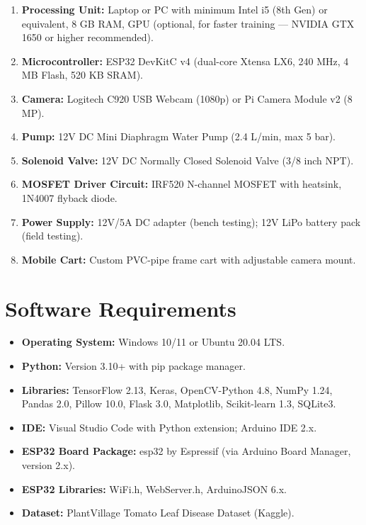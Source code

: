 \documentclass[12pt,a4paper,oneside]{report}
\begin{document}
\begin{enumerate}[leftmargin=2em]
    \item \textbf{Processing Unit:} Laptop or PC with minimum Intel i5 (8th Gen) or equivalent, 8 GB RAM, GPU (optional, for faster training — NVIDIA GTX 1650 or higher recommended).
    \item \textbf{Microcontroller:} ESP32 DevKitC v4 (dual-core Xtensa LX6, 240 MHz, 4 MB Flash, 520 KB SRAM).
    \item \textbf{Camera:} Logitech C920 USB Webcam (1080p) or Pi Camera Module v2 (8 MP).
    \item \textbf{Pump:} 12V DC Mini Diaphragm Water Pump (2.4 L/min, max 5 bar).
    \item \textbf{Solenoid Valve:} 12V DC Normally Closed Solenoid Valve (3/8 inch NPT).
    \item \textbf{MOSFET Driver Circuit:} IRF520 N-channel MOSFET with heatsink, 1N4007 flyback diode.
    \item \textbf{Power Supply:} 12V/5A DC adapter (bench testing); 12V LiPo battery pack (field testing).
    \item \textbf{Mobile Cart:} Custom PVC-pipe frame cart with adjustable camera mount.
\end{enumerate}

\section{Software Requirements}

\begin{itemize}[leftmargin=2em]
    \item \textbf{Operating System:} Windows 10/11 or Ubuntu 20.04 LTS.
    \item \textbf{Python:} Version 3.10+ with pip package manager.
    \item \textbf{Libraries:} TensorFlow 2.13, Keras, OpenCV-Python 4.8, NumPy 1.24, Pandas 2.0, Pillow 10.0, Flask 3.0, Matplotlib, Scikit-learn 1.3, SQLite3.
    \item \textbf{IDE:} Visual Studio Code with Python extension; Arduino IDE 2.x.
    \item \textbf{ESP32 Board Package:} esp32 by Espressif (via Arduino Board Manager, version 2.x).
    \item \textbf{ESP32 Libraries:} WiFi.h, WebServer.h, ArduinoJSON 6.x.
    \item \textbf{Dataset:} PlantVillage Tomato Leaf Disease Dataset (Kaggle).
\end{itemize}
\end{document}
